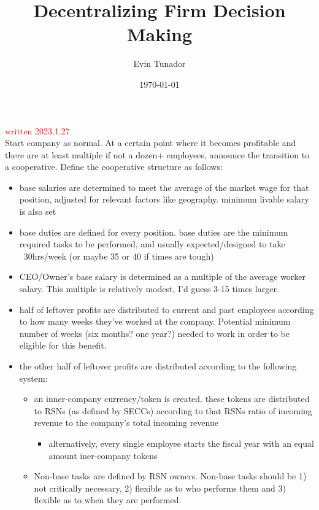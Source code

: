 \documentclass{article}[10pt]
\title{Decentralizing Firm Decision Making}
\author{Evin Tunador}
\date{\today}
\begin{document}
\maketitle

\hline
\vspace{0.1in}
\textcolor{red}{written 2023.1.27}\\

Start company as normal.
At a certain point where it becomes profitable and there are at least multiple if not a dozen+ employees, announce the transition to a cooperative.
Define the cooperative structure as follows:
\begin{itemize}
    \item base salaries are determined to meet the average of the market wage for that position, adjusted for relevant factors like geography.
    minimum livable salary is also set
    \item base duties are defined for every position.
    base duties are the minimum required tasks to be performed, and usually expected/designed to take ~30hrs/week (or maybe 35 or 40 if times are tough)
    \item CEO/Owner's base salary is determined as a multiple of the average worker salary.
    This multiple is relatively modest, I'd guess 3-15 times larger.
    \item half of leftover profits are distributed to current and past employees according to how many weeks they've worked at the company.
    Potential minimum number of weeks (six months? one year?) needed to work in order to be eligible for this benefit.
    \item the other half of leftover profits are distributed according to the following system:
    \begin{itemize}
        \item an inner-company currency/token is created.
        these tokens are distributed to RSNs (as defined by SECCs) according to that RSNs ratio of incoming revenue to the company's total incoming revenue
        \begin{itemize}
            \item alternatively, every single employee starts the fiscal year with an equal amount iner-company tokens
        \end{itemize}
        \item Non-base tasks are defined by RSN owners.
        Non-base tasks should be 1) not critically necessary, 2) flexible as to who performs them and 3) flexible as to when they are performed.

\end{itemize}
\end{itemize}
\end{document}
